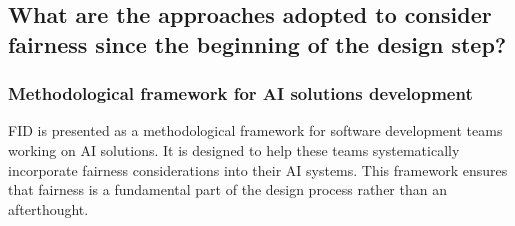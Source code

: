 \documentclass{article}
\begin{document}
\newpage
\subsection{What are the approaches adopted to consider fairness since the beginning of the design step?}
\subsubsection{Methodological framework for AI solutions development}
FID\cite{10091496} is presented as a methodological framework for software development teams working on AI solutions. It is designed to help these teams systematically incorporate fairness considerations into their AI systems. This framework ensures that fairness is a fundamental part of the design process rather than an afterthought.
\end{document}
